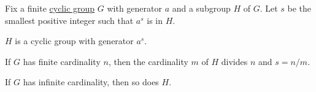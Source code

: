 \begin{proposition}\label{thm:cyclic_subgroup_classification}
  Fix a finite \hyperref[def:cyclic_group]{cyclic group} \( G \) with generator \( a \) and a subgroup \( H \) of \( G \). Let \( s \) be the smallest positive integer such that \( a^s \) is in \( H \).

  \begin{thmenum}
     \( H \) is a cyclic group with generator \( a^s \).

     If \( G \) has finite cardinality \( n \), then the cardinality \( m \) of \( H \) divides \( n \) and \( s = n / m \).

     If \( G \) has infinite cardinality, then so does \( H \).
  \end{thmenum}
\end{proposition}
